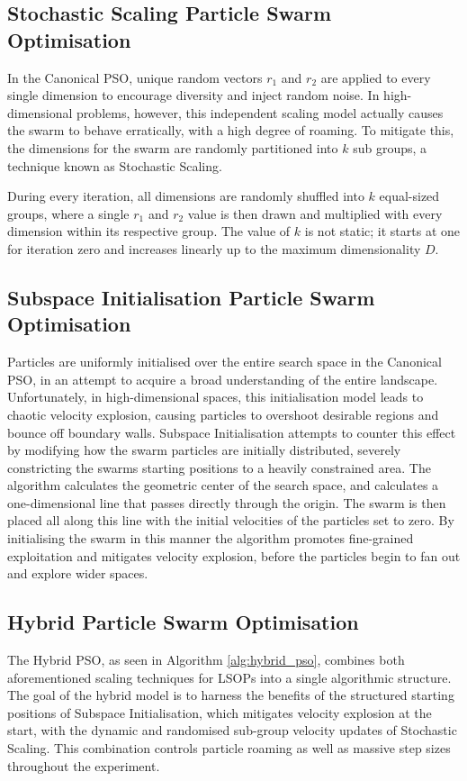 \documentclass[conference]{IEEEtran}
\begin{document}
\subsection{Stochastic Scaling Particle Swarm Optimisation}
    In the Canonical PSO, unique random vectors $r_1$ and $r_2$ are applied to every single dimension to encourage diversity 
    and inject random noise. In high-dimensional problems, however, this independent scaling model actually causes the 
    swarm to behave erratically, with a high degree of roaming. To mitigate this, the dimensions for the swarm are randomly partitioned into $k$ 
    sub groups, a technique known as Stochastic Scaling. 

    During every iteration, all dimensions are 
    randomly shuffled into $k$ equal-sized groups, where a single $r_1$ and $r_2$ value is then drawn and multiplied 
    with every dimension within its respective group. The value of $k$ is not static; it starts at one for iteration zero and increases linearly 
    up to the maximum dimensionality $D$.  

\subsection{Subspace Initialisation Particle Swarm Optimisation}
    Particles are uniformly initialised over the entire search space in the Canonical PSO, in an attempt to acquire a broad understanding of the entire
    landscape. Unfortunately, in high-dimensional spaces, this initialisation model leads to chaotic velocity explosion, causing particles to overshoot desirable regions and bounce 
    off boundary walls. Subspace Initialisation attempts to counter this effect by modifying how the swarm particles are initially distributed, severely 
    constricting the swarms starting positions to a heavily constrained area. The algorithm calculates the geometric center of the search space, and 
    calculates a one-dimensional line that passes directly through the origin. The swarm is then placed all along this line with the initial velocities of the particles 
    set to zero. By initialising the swarm in this manner the algorithm promotes fine-grained exploitation and mitigates 
    velocity explosion, before the particles begin to fan out and explore wider spaces. 

\subsection{Hybrid Particle Swarm Optimisation}
    The Hybrid PSO, as seen in Algorithm \ref{alg:hybrid_pso}, combines both aforementioned scaling techniques for LSOPs into a single algorithmic structure. The goal of the hybrid model is to harness the 
    benefits of the structured starting positions of Subspace Initialisation, which mitigates velocity explosion at the start, with the dynamic and randomised 
    sub-group velocity updates of Stochastic Scaling. This combination controls particle roaming as well as massive step sizes throughout the experiment. 
    
\end{document}

